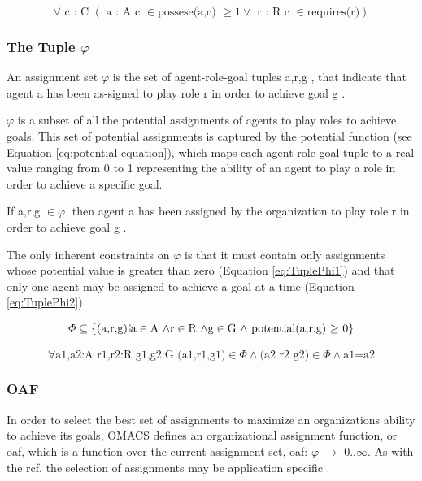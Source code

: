 \begin{equation}
\forall\textrm{ c : C }\left(\textrm{ a : A c }\in\textrm{possese(a,c) }\geq1\lor\textrm{ r : R c }\in\textrm{requires(r)}\right)\label{eq : capabilities}
\end{equation}


\subsubsection{The Tuple  $\varphi$} 
An assignment set $\varphi$ is the set of agent-role-goal tuples  \textlangle{} a,r,g \textrangle{}, that indicate that agent a has been as-signed to play role r in order to achieve goal g \cite{omacs4}.

$\varphi$ is a subset of all the potential assignments of agents to play roles to achieve goals. This set of potential assignments is captured by the potential function (see Equation \ref{eq:potential equation}), which maps each agent-role-goal tuple to a real value ranging from 0 to 1 representing the ability of an agent to play a role in order to achieve a specific goal.
	  
If \textlangle a,r,g \textrangle $\in \varphi$, then agent a has been assigned by the organization to play role r in order to achieve goal g \cite{omacs4}.

The only inherent constraints on $\varphi$ is that it must contain only assignments whose potential value is greater than zero (Equation \ref{eq:TuplePhi1}) and that only one agent may be assigned to achieve a goal at a time (Equation \ref{eq:TuplePhi2})		


\begin{equation}
\varPhi\subseteq\left\{ \left(\textrm{a,r,g}\right)\brokenvert\textrm{a}\in\textrm{A \ensuremath{\land}}\textrm{r}\in\textrm{R \ensuremath{\land\textrm{g}\in\textrm{G \ensuremath{\land} \textrm{potential(a,r,g) \ensuremath{\ge} 0}}}}\right\} 
\label{eq:TuplePhi1}
\end{equation}

\begin{equation}
\forall\textrm{a1,a2:A r1,r2:R g1,g2:G (a1,r1,g1)}\in\varPhi\land\textrm{(a2 r2 g2)}\in\varPhi\land\textrm{a1=a2}\label{eq:TuplePhi2}
\end{equation}

 		
 

\subsubsection{OAF}
In order to select the best set of assignments to maximize an organizations ability to achieve its goals, OMACS defines an organizational assignment function, or oaf, which is a function over the current assignment set, oaf: $\varphi$ $\rightarrow$ 0..$\infty$. As with the rcf, the selection of assignments may be application specific  \cite{omacs4}.
	

